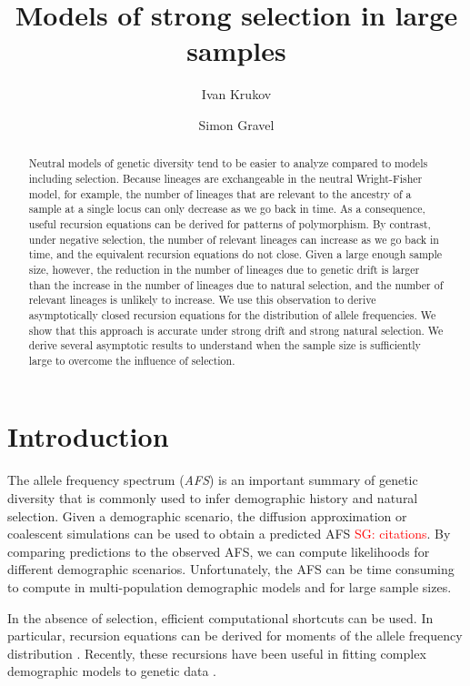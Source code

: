 \documentclass[review]{elsarticle}
\newcommand{\sgcomment}[1]{\textcolor{red}{SG: #1}}
\begin{document}
\begin{frontmatter}
  \title{Models of strong selection in large samples}

  \author{Ivan Krukov}
  \author{Simon Gravel}

  \begin{abstract}
    Neutral models of genetic diversity tend to be easier to analyze compared to models including
    selection. Because lineages are exchangeable in the neutral Wright-Fisher model, for example,
    the number of lineages that are relevant to the ancestry of a sample at a single locus can only
    decrease as we go back in time. As a consequence, useful recursion equations can be derived for
    patterns of polymorphism. By contrast, under negative selection, the number of relevant lineages
    can increase as we go back in time, and the equivalent recursion equations do not close. Given a
    large enough sample size, however, the reduction in the number of lineages due to genetic drift
    is larger than the increase in the number of lineages due to natural selection, and the number
    of relevant lineages is unlikely to increase. We use this observation to derive asymptotically
    closed recursion equations for the distribution of allele frequencies. We show that this
    approach is accurate under strong drift and strong natural selection. We derive several
    asymptotic results to understand when the sample size is sufficiently large to overcome the
    influence of selection.
    
  \end{abstract}
\end{frontmatter}

\section{Introduction}
\label{sec:introduciton}

The allele frequency spectrum (\textit{AFS}) is an important summary of genetic diversity that is commonly used to infer demographic history and natural selection. Given a demographic scenario, the diffusion approximation or coalescent simulations can be used to obtain a predicted AFS \sgcomment{citations}. By comparing predictions to the observed AFS, we can compute likelihoods for different demographic scenarios. Unfortunately, the AFS can be time consuming to compute in multi-population demographic models and for large sample sizes. \cite{}

In the absence of selection, efficient computational shortcuts can be used. In particular, recursion equations can be derived for moments of the allele frequency distribution \citep{KimuraCrow1964,Ewens1972,JouganousEtAl2017}. Recently, these recursions have been useful in fitting complex demographic models to genetic data
 \citep{JouganousEtAl2017,KammEtAl2017}. 
 
\end{document}

